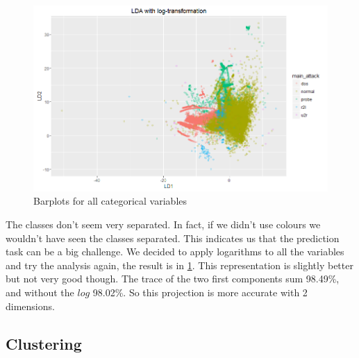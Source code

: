 \documentclass[a4paper]{article} %
\begin{document}
\begin{figure}[H]
	\centering
	\includegraphics[scale=0.45]{LDA_log.png}
	\caption{Barplots for all categorical variables}
	\label{fig:fda_log}
\end{figure}
The classes don't seem very separated. In fact, if we didn't use colours we wouldn't have seen the classes separated. This indicates us that the prediction task can be a big challenge. We decided to apply logarithms to all the variables and try the analysis again, the result is in \ref{fig:fda_log}. This representation is slightly better but not very good though. The trace of the two first components sum 98.49\%, and without the $log$ 98.02\%. So this projection is more accurate with 2 dimensions. 

\subsection{Clustering}







\medskip

\printbibliography

\end{document}

